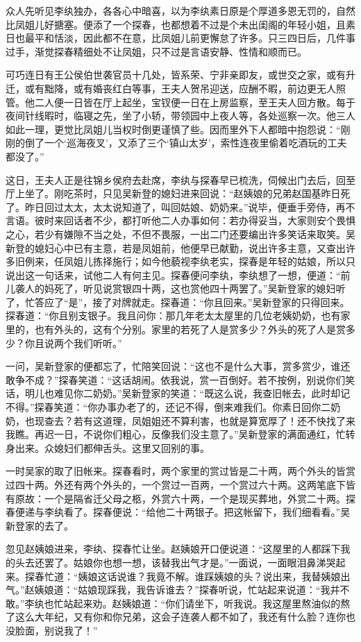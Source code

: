 \documentclass[12pt,oneside]{book}
\begin{document}
众人先听见李纨独办，各各心中暗喜，以为李纨素日原是个厚道多恩无罚的，自然比凤姐儿好搪塞。便添了一个探春，也都想着不过是个未出闺阁的年轻小姐，且素日也最平和恬淡，因此都不在意，比凤姐儿前更懈怠了许多。只三四日后，几件事过手，渐觉探春精细处不让凤姐，只不过是言语安静、性情和顺而已。

可巧连日有王公侯伯世袭官员十几处，皆系荣、宁非亲即友，或世交之家，或有升迁，或有黜降，或有婚丧红白等事，王夫人贺吊迎送，应酬不暇，前边更无人照管。他二人便一日皆在厅上起坐，宝钗便一日在上房监察，至王夫人回方散。每于夜间针线暇时，临寝之先，坐了小轿，带领园中上夜人等，各处巡察一次。他三人如此一理，更觉比凤姐儿当权时倒更谨慎了些。因而里外下人都暗中抱怨说：“刚刚的倒了一个‘巡海夜叉’，又添了三个‘镇山太岁’，索性连夜里偷着吃酒玩的工夫都没了。”

这日，王夫人正是往锦乡侯府去赴席，李纨与探春早已梳洗，伺候出门去后，回至厅上坐了。刚吃茶时，只见吴新登的媳妇进来回说：“赵姨娘的兄弟赵国基昨日死了。昨日回过太太，太太说知道了，叫回姑娘、奶奶来。”说毕，便垂手旁侍，再不言语。彼时来回话者不少，都打听他二人办事如何：若办得妥当，大家则安个畏惧之心，若少有嫌隙不当之处，不但不畏服，一出二门还要编出许多笑话来取笑。吴新登的媳妇心中已有主意，若是凤姐前，他便早已献勤，说出许多主意，又查出许多旧例来，任凤姐儿拣择施行；如今他藐视李纨老实，探春是年轻的姑娘，所以只说出这一句话来，试他二人有何主见。探春便问李纨，李纨想了一想，便道：“前儿袭人的妈死了，听见说赏银四十两，这也赏他四十两罢了。”吴新登家的媳妇听了，忙答应了“是”，接了对牌就走。探春道：“你且回来。”吴新登家的只得回来。探春道：“你且别支银子。我且问你：那几年老太太屋里的几位老姨奶奶，也有家里的，也有外头的，这有个分别。家里的若死了人是赏多少？外头的死了人是赏多少？你且说两个我们听听。”

一问，吴新登家的便都忘了，忙陪笑回说：“这也不是什么大事，赏多赏少，谁还敢争不成？”探春笑道：“这话胡闹。依我说，赏一百倒好。若不按例，别说你们笑话，明儿也难见你二奶奶。”吴新登家的笑道：“既这么说，我查旧帐去，此时却记不得。”探春笑道：“你办事办老了的，还记不得，倒来难我们。你素日回你二奶奶，也现查去？若有这道理，凤姐姐还不算利害，也就是算宽厚了！还不快找了来我瞧。再迟一日，不说你们粗心，反像我们没主意了。”吴新登家的满面通红，忙转身出来。众媳妇们都伸舌头。这里又回别的事。

一时吴家的取了旧帐来。探春看时，两个家里的赏过皆是二十两，两个外头的皆赏过四十两。外还有两个外头的，一个赏过一百两，一个赏过六十两。这两笔底下皆有原故：一个是隔省迁父母之柩，外赏六十两，一个是现买葬地，外赏二十两。探春便递与李纨看了。探春便说：“给他二十两银子。把这帐留下，我们细看看。”吴新登家的去了。

忽见赵姨娘进来，李纨、探春忙让坐。赵姨娘开口便说道：“这屋里的人都踩下我的头去还罢了。姑娘你也想一想，该替我出气才是。”一面说，一面眼泪鼻涕哭起来。探春忙道：“姨娘这话说谁？我竟不解。谁踩姨娘的头？说出来，我替姨娘出气。”赵姨娘道：“姑娘现踩我，我告诉谁去？”探春听说，忙站起来说道：“我并不敢。”李纨也忙站起来劝。赵姨娘道：“你们请坐下，听我说。我这屋里熬油似的熬了这么大年纪，又有你和你兄弟，这会子连袭人都不如了，我还有什么脸？连你也没脸面，别说我了！”
\end{document}
